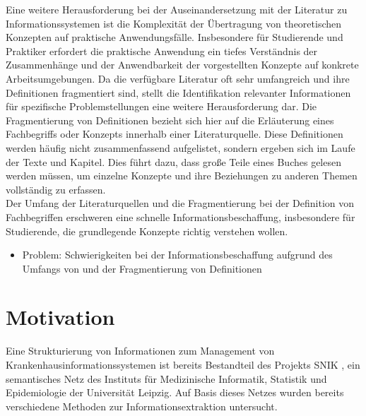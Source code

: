 Eine weitere Herausforderung bei der Auseinandersetzung mit der Literatur zu Informationssystemen ist die Komplexität der Übertragung von theoretischen Konzepten auf praktische Anwendungsfälle.
Insbesondere für Studierende und Praktiker erfordert die praktische Anwendung ein tiefes Verständnis der Zusammenhänge und der Anwendbarkeit der vorgestellten Konzepte auf konkrete Arbeitsumgebungen. 
Da die verfügbare Literatur oft sehr umfangreich und ihre Definitionen fragmentiert sind, stellt die Identifikation relevanter Informationen für spezifische Problemstellungen eine weitere Herausforderung dar.
Die Fragmentierung von Definitionen bezieht sich hier auf die Erläuterung eines Fachbegriffs oder Konzepts innerhalb einer Literaturquelle.
Diese Definitionen werden häufig nicht zusammenfassend aufgelistet, sondern ergeben sich im Laufe der Texte und Kapitel.
Dies führt dazu, dass große Teile eines Buches gelesen werden müssen, um einzelne Konzepte und ihre Beziehungen zu anderen Themen vollständig zu erfassen.\\

Der Umfang der Literaturquellen und die Fragmentierung bei der Definition von Fachbegriffen
erschweren eine schnelle Informationsbeschaffung, insbesondere für Studierende, die grundlegende Konzepte richtig verstehen wollen.\\

\begin{itemize}
  \item Problem: Schwierigkeiten bei der Informationsbeschaffung aufgrund des Umfangs von \citet{bb} und der Fragmentierung von Definitionen
\end{itemize}

\section{Motivation}

Eine Strukturierung von Informationen zum Management von Krankenhausinformationssystemen ist bereits Bestandteil des Projekts SNIK \citep{semantischesnetz, domaene}, 
ein semantisches Netz des Instituts für Medizinische Informatik, Statistik und Epidemiologie der Universität Leipzig.
Auf Basis dieses Netzes wurden bereits verschiedene Methoden zur Informationsextraktion untersucht.\\

